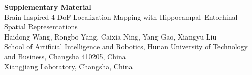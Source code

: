 \documentclass[11pt]{article}
\begin{document}
\begin{center}
{\Large\bfseries Supplementary Material}\\[8pt]
{\large Brain-Inspired 4-DoF Localization-Mapping with Hippocampal--Entorhinal Spatial Representations}\\[8pt]
Haidong Wang, Rongbo Yang, Caixia Ning, Yang Gao, Xiangyu Liu\\[4pt]
{\small School of Artificial Intelligence and Robotics, Hunan University of Technology and Business, Changsha 410205, China\\
Xiangjiang Laboratory, Changsha, China}
\end{center}

\vspace{1em}

\end{document}

